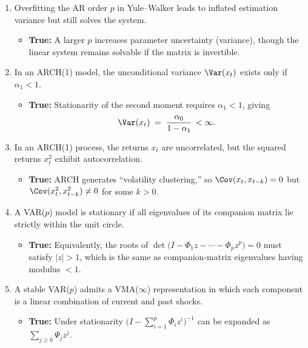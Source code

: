 \documentclass[11pt]{article}
\begin{document}
\begin{enumerate}
  \item Overfitting the AR order $p$ in Yule–Walker leads to inflated estimation variance but still solves the system.
  \begin{itemize}
    \item \textbf{True:} A larger $p$ increases parameter uncertainty (variance), though the linear system remains solvable if the matrix is invertible.
  \end{itemize}

   \item In an ARCH(1) model, the unconditional variance $\Var(x_t)$ exists only if $\alpha_1<1$.
  \begin{itemize}
    \item \textbf{True:} Stationarity of the second moment requires $\alpha_1<1$, giving 
      \[
        \Var(x_t) \;=\;\frac{\alpha_0}{1-\alpha_1}\,<\infty.
      \]
  \end{itemize}

  \item In an ARCH(1) process, the returns $x_t$ are uncorrelated, but the squared returns $x_t^2$ exhibit autocorrelation.
  \begin{itemize}
    \item \textbf{True:} ARCH generates “volatility clustering,” so 
      \(\Cov(x_t,x_{t-k})=0\) but \(\Cov(x_t^2,x_{t-k}^2)\neq0\) for some \(k>0\).
  \end{itemize}

  \item A VAR($p$) model is stationary if all eigenvalues of its companion matrix lie strictly within the unit circle.
  \begin{itemize}
    \item \textbf{True:} Equivalently, the roots of 
      \(\det\bigl(I - \Phi_1 z - \cdots - \Phi_p z^p\bigr)=0\)
      must satisfy \(|z|>1\), which is the same as companion‐matrix eigenvalues having modulus \(<1\).
  \end{itemize}

  \item A stable VAR($p$) admits a VMA($\infty$) representation in which each component is a linear combination of current and past shocks.
  \begin{itemize}
    \item \textbf{True:} Under stationarity \(\bigl(I - \sum_{i=1}^p\Phi_i z^i\bigr)^{-1}\)
      can be expanded as \(\sum_{j\ge0}\Psi_j z^j\).
  \end{itemize}


\end{enumerate}
\end{document}
